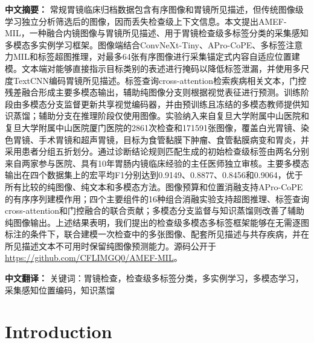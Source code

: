 \documentclass[Afour,sagev,times]{sagej}
\begin{document}

\maketitle

\noindent\textbf{中文摘要：} 常规胃镜临床归档数据包含有序图像和胃镜所见描述，但传统图像级学习独立分析筛选后的图像，因而丢失检查级上下文信息。本文提出AMEF-MIL，一种融合内镜图像与胃镜所见描述、用于胃镜检查级多标签分类的采集感知多模态多实例学习框架。图像端结合ConvNeXt-Tiny、APro-CoPE、多标签注意力MIL和标签超图推理，对最多64张有序图像进行采集锚定式内容自适应位置建模。文本端对能够直接指示目标类别的表述进行掩码以降低标签泄漏，并使用多尺度TextCNN编码胃镜所见描述。标签查询cross-attention检索疾病相关文本，门控残差融合形成主要多模态输出，辅助纯图像分支则根据视觉表征进行预测。训练阶段由多模态分支监督更新共享视觉编码器，并由预训练且冻结的多模态教师提供知识蒸馏；辅助分支在推理阶段仅使用图像。实验纳入来自复旦大学附属中山医院和复旦大学附属中山医院厦门医院的2861次检查和171591张图像，覆盖白光胃镜、染色胃镜、手术胃镜和超声胃镜，目标为食管黏膜下肿瘤、食管黏膜病变和胃炎，并采用患者分组五折划分。通过诊断结论规则匹配生成的初始检查级标签由两名分别来自两家参与医院、具有10年胃肠内镜临床经验的主任医师独立审核。主要多模态输出在四个数据集上的宏平均F1分别达到0.9149、0.8877、0.8456和0.9064，优于所有比较的纯图像、纯文本和多模态方法。图像预算和位置消融支持APro-CoPE的有序序列建模作用；四个主要组件的16种组合消融实验支持超图推理、标签查询cross-attention和门控融合的联合贡献；多模态分支监督与知识蒸馏则改善了辅助纯图像输出。上述结果表明，我们提出的检查级多模态多标签框架能够在无需逐图标注的条件下，联合建模一次检查中的多张图像、配套所见描述与共存疾病，并在所见描述文本不可用时保留纯图像预测能力。源码公开于\url{https://github.com/CFLIMGQ0/AMEF-MIL}。

\noindent\textbf{中文翻译：} 关键词：胃镜检查，检查级多标签分类，多实例学习，多模态学习，采集感知位置编码，知识蒸馏

\medskip

\section{Introduction}
\end{document}
